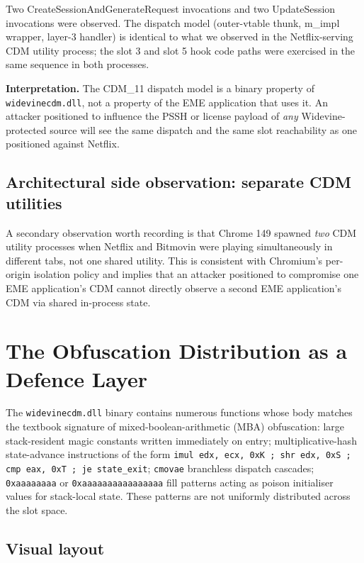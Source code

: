 \documentclass[11pt,letterpaper]{article}
\begin{document}
\noindent Two CreateSessionAndGenerateRequest invocations and two
UpdateSession invocations were observed. The dispatch model
(outer-vtable thunk, m\_impl wrapper, layer-3 handler) is identical
to what we observed in the Netflix-serving CDM utility process; the
slot 3 and slot 5 hook code paths were exercised in the same
sequence in both processes.

\textbf{Interpretation.} The CDM\_11 dispatch model is a binary
property of \texttt{widevinecdm.dll}, not a property of the EME
application that uses it. An attacker positioned to influence the
PSSH or license payload of \emph{any} Widevine-protected source
will see the same dispatch and the same slot reachability as one
positioned against Netflix.

\subsection{Architectural side observation: separate CDM utilities}

A secondary observation worth recording is that Chrome 149 spawned
\emph{two} CDM utility processes when Netflix and Bitmovin were
playing simultaneously in different tabs, not one shared utility.
This is consistent with Chromium's per-origin isolation policy and
implies that an attacker positioned to compromise one EME
application's CDM cannot directly observe a second EME application's
CDM via shared in-process state.

\section{The Obfuscation Distribution as a Defence Layer}
\label{sec:obfuscation}

The \texttt{widevinecdm.dll} binary contains numerous functions
whose body matches the textbook signature of mixed-boolean-arithmetic
(MBA) obfuscation: large stack-resident magic constants written
immediately on entry; multiplicative-hash state-advance instructions
of the form \texttt{imul edx, ecx, 0xK ; shr edx, 0xS ; cmp eax, 0xT
; je state\_exit}; \texttt{cmovae} branchless dispatch cascades;
\texttt{0xaaaaaaaa} or \texttt{0xaaaaaaaaaaaaaaaa} fill patterns
acting as poison initialiser values for stack-local state. These
patterns are not uniformly distributed across the slot space.

\subsection{Visual layout}
\end{document}
